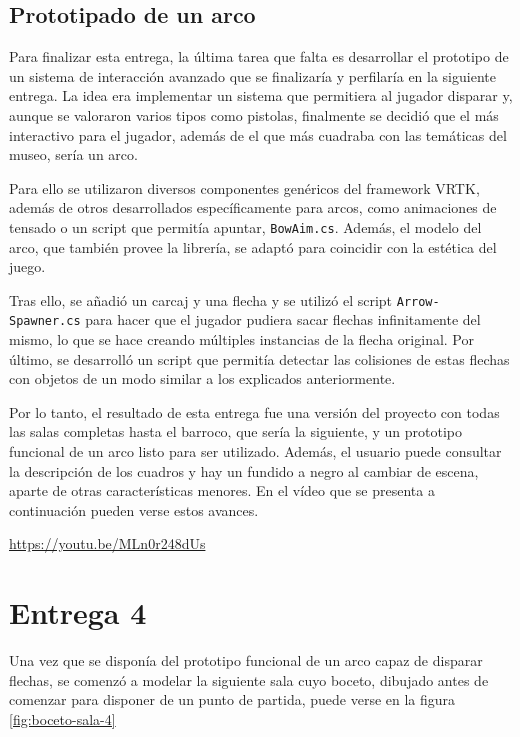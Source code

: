 \subsection{Prototipado de un arco}

Para finalizar esta entrega, la última tarea que falta es desarrollar el prototipo de un sistema de interacción avanzado que se finalizaría y perfilaría en la siguiente entrega. La idea era implementar un sistema que permitiera al jugador disparar y, aunque se valoraron varios tipos como pistolas, finalmente se decidió que el más interactivo para el jugador, además de el que más cuadraba con las temáticas del museo, sería un arco.

Para ello se utilizaron diversos componentes genéricos del framework \acs{VRTK}, además de otros desarrollados específicamente para arcos, como animaciones de tensado o un script que permitía apuntar, \texttt{BowAim.cs}. Además, el modelo del arco, que también provee la librería, se adaptó para coincidir con la estética del juego.

Tras ello, se añadió un carcaj y una flecha y se utilizó el script \texttt{Arrow-} \texttt{Spawner.cs} para hacer que el jugador pudiera sacar flechas infinitamente del mismo, lo que se hace creando múltiples instancias de la flecha original. Por último, se desarrolló un script que permitía detectar las colisiones de estas flechas con objetos de un modo similar a los explicados anteriormente.

Por lo tanto, el resultado de esta entrega fue una versión del proyecto con todas las salas completas hasta el barroco, que sería la siguiente, y un prototipo funcional de un arco listo para ser utilizado. Además, el usuario puede consultar la descripción de los cuadros y hay un fundido a negro al cambiar de escena, aparte de otras características menores. En el vídeo que se presenta a continuación pueden verse estos avances.

\begin{center}
    \url{https://youtu.be/MLn0r248dUs}
\end{center}



\section{Entrega 4}

Una vez que se disponía del prototipo funcional de un arco capaz de disparar flechas, se comenzó a modelar la siguiente sala cuyo boceto, dibujado antes de comenzar para disponer de un punto de partida, puede verse en la figura \ref{fig:boceto-sala-4}

